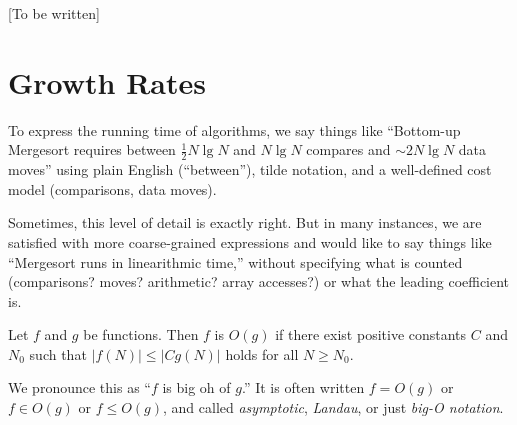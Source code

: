\documentclass[a4paper,nobib]{tufte-handout}
\begin{document}
[To be written]

\section{Growth Rates}



To express the running time of algorithms, we say things like
``Bottom-up Mergesort requires between $\frac{1}{2}N\lg N$ and
$N\lg N$ compares and $\sim 2N\lg N$ data moves'' using plain English
(``between''), tilde notation, and a well-defined cost model
(comparisons, data moves).

Sometimes, this level of detail is exactly right.
But in many instances, we are satisfied with more coarse-grained
expressions and  would like to say things like
``Mergesort runs in linearithmic time,'' without specifying what is
counted (comparisons? moves? arithmetic? array accesses?) or what the
leading coefficient is.

Let $f$ and $g$ be functions. Then $f$ is $O(g)$ if there exist
positive constants $C$ and $N_0$ such that
$|f(N)|\leq  |Cg(N)|$ holds for all $N\geq N_0$.

We pronounce this as ``$f$ is big oh of $g$.''
It is often written $f=O(g)$ or $f\in O(g)$ or $f \le O(g)$, and called 
\emph{asymptotic}, \emph{Landau}, or just \emph{big-O notation}.
\end{document}
